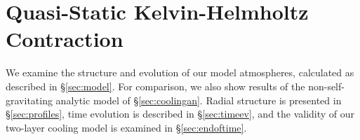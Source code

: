 \documentclass[apj, numberedappendix]{emulateapj}
\newcommand{\yr}{\; {\rm yr}}
\newcommand{\Eq}[1]{Equation\,(\ref{#1})}
\newcommand{\co}{_{\rm c}}
\newcommand{\mcn}[1] { m_{ \rm c #1} }
\newcommand{\MC}{M_{\rm crit}}
\newcommand{\aun}[1]{ a_{#1} }
\begin{document}


\section{Quasi-Static Kelvin-Helmholtz Contraction}
\label{sec:KH}

We examine the structure and evolution of our model atmospheres, calculated as described in \S\ref{sec:model}.  For comparison, we also show results of the non-self-gravitating analytic model of \S\ref{sec:coolingan}.  Radial structure is presented in \S\ref{sec:profiles}, time evolution is described in \S\ref{sec:timeev}, and the validity of our two-layer cooling model is examined in \S\ref{sec:endoftime}.
\end{document}
